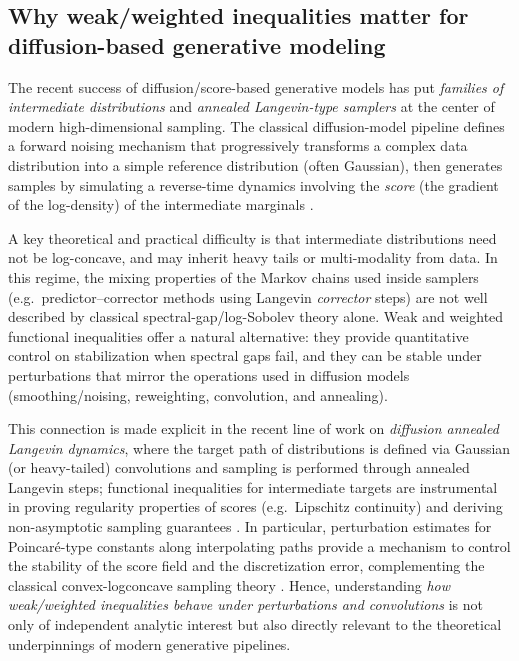 \documentclass[11pt,reqno]{amsart}
\numberwithin{equation}{section}
\theoremstyle{definition}
\theoremstyle{remark}
\begin{document}
\subsection{Why weak/weighted inequalities matter for diffusion-based generative modeling}

The recent success of diffusion/score-based generative models has put \emph{families of intermediate distributions} and \emph{annealed Langevin-type samplers} at the center of modern high-dimensional sampling. The classical diffusion-model pipeline defines a forward noising mechanism that progressively transforms a complex data distribution into a simple reference distribution (often Gaussian), then generates samples by simulating a reverse-time dynamics involving the \emph{score} (the gradient of the log-density) of the intermediate marginals \cite{SohlDickstein2015,HoJainAbbeel2020,song2021scorebased}.

A key theoretical and practical difficulty is that intermediate distributions need not be log-concave, and may inherit heavy tails or multi-modality from data. In this regime, the mixing properties of the Markov chains used inside samplers (e.g.\ predictor--corrector methods using Langevin \emph{corrector} steps) are not well described by classical spectral-gap/log-Sobolev theory alone. Weak and weighted functional inequalities offer a natural alternative: they provide quantitative control on stabilization when spectral gaps fail, and they can be stable under perturbations that mirror the operations used in diffusion models (smoothing/noising, reweighting, convolution, and annealing).

This connection is made explicit in the recent line of work on \emph{diffusion annealed Langevin dynamics}, where the target path of distributions is defined via Gaussian (or heavy-tailed) convolutions and sampling is performed through annealed Langevin steps; functional inequalities for intermediate targets are instrumental in proving regularity properties of scores (e.g.\ Lipschitz continuity) and deriving non-asymptotic sampling guarantees \cite{Corderoetal}.
In particular, perturbation estimates for Poincar\'e-type constants along interpolating paths provide a mechanism to control the stability of the score field and the discretization error, complementing the classical convex-logconcave sampling theory \cite{Dal17}.
Hence, understanding \emph{how weak/weighted inequalities behave under perturbations and convolutions} is not only of independent analytic interest but also directly relevant to the theoretical underpinnings of modern generative pipelines.
\end{document}
